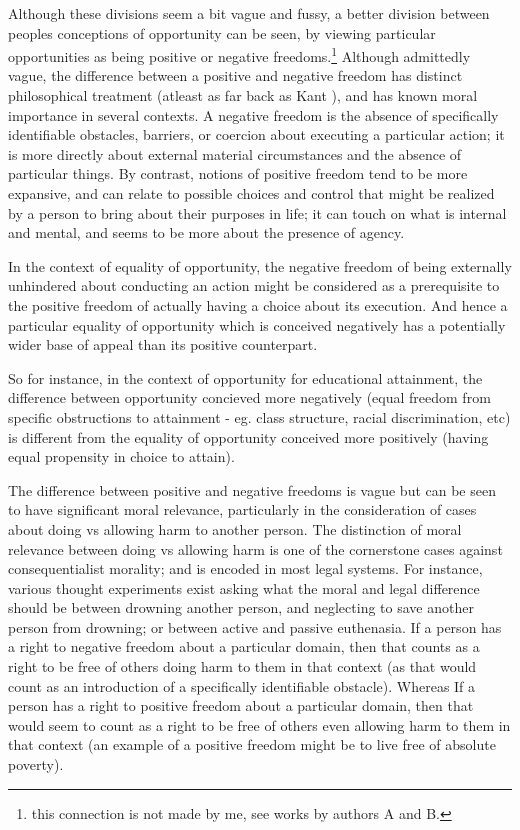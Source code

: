 Although these divisions seem a bit vague and fussy, a better division between peoples conceptions of opportunity can be seen, by viewing particular opportunities as being positive or negative freedoms.\footnote{this connection is not made by me, see works by authors A and B.}
Although admittedly vague, the difference between a positive and negative freedom has distinct philosophical treatment (atleast as far back as Kant \cite{}), and has known moral importance in several contexts.
A negative freedom is the absence of specifically identifiable obstacles, barriers, or coercion about executing a particular action; it is more directly about external material circumstances and the absence of particular things.
By contrast, notions of positive freedom tend to be more expansive, and can relate to possible choices and control that might be realized by a person to bring about their purposes in life; it can touch on what is internal and mental, and seems to be more about the presence of agency.

In the context of equality of opportunity, the negative freedom of being externally unhindered about conducting an action might be considered as a prerequisite to the positive freedom of actually having a choice about its execution.
And hence a particular equality of opportunity which is conceived negatively has a  potentially wider base of appeal than its positive counterpart.

So for instance, in the context of opportunity for educational attainment, the difference between opportunity concieved more negatively (equal freedom from specific obstructions to attainment - eg. class structure, racial discrimination, etc) is different from the equality of opportunity conceived more positively (having equal propensity in choice to attain).

The difference between positive and negative freedoms is vague but can be seen to have significant moral relevance, particularly in the consideration of cases about doing vs allowing harm to another person.
The distinction of moral relevance between doing vs allowing harm is one of the cornerstone cases against consequentialist morality; and is encoded in most legal systems.
For instance, various thought experiments exist asking what the moral and legal difference should be between drowning another person, and neglecting to save another person from drowning; or between active and passive euthenasia.
If a person has a right to negative freedom about a particular domain, then that counts as a right to be free of others doing harm to them in that context (as that would count as an introduction of a specifically identifiable obstacle).
Whereas If a person has a right to positive freedom about a particular domain, then that would seem to count as a right to be free of others even allowing harm to them in that context (an example of a positive freedom might be to live free of absolute poverty).

